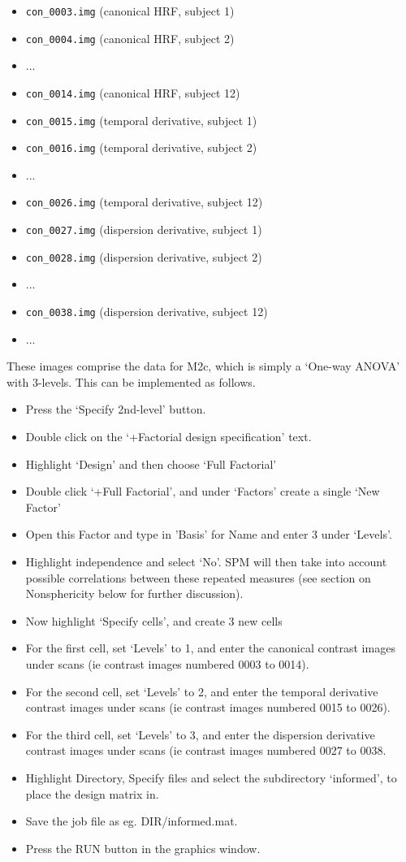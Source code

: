 \documentclass[a4paper,titlepage]{book}
\newcommand{\bi}{\begin{itemize}}
\newcommand{\ei}{\end{itemize}}
\begin{document}
\bi
\item{\verb!con_0003.img!		(canonical HRF, subject 1)}
\item{\verb!con_0004.img!		(canonical HRF, subject 2)}
\item{...}
\item{\verb!con_0014.img!		(canonical HRF, subject 12)}
\item{\verb!con_0015.img!		(temporal derivative, subject 1)}
\item{\verb!con_0016.img!		(temporal derivative, subject 2)}
\item{...}
\item{\verb!con_0026.img!		(temporal derivative, subject 12)}
\item{\verb!con_0027.img!		(dispersion derivative, subject 1)}
\item{\verb!con_0028.img!		(dispersion derivative, subject 2)}
\item{...}
\item{\verb!con_0038.img!		(dispersion derivative, subject 12)}
\item{...}
\ei
These images comprise the data for M2c, which is simply a `One-way ANOVA' with 3-levels. This can be implemented as follows.
\bi
\item{Press the `Specify 2nd-level' button.}
\item{Double click on the `+Factorial design specification' text.}
\item{Highlight `Design' and then choose `Full Factorial'}
\item{Double click `+Full Factorial', and under `Factors' create a single `New Factor'}
\item{Open this Factor and type in 'Basis' for Name and enter 3 under `Levels'.}
\item{Highlight independence and select `No'. SPM will then take into account possible correlations between these repeated measures (see section on Nonsphericity below for further discussion).}
\item{Now highlight `Specify cells', and create 3 new cells}  
\item{For the first cell, set `Levels' to 1, and enter the canonical contrast images under scans (ie contrast images numbered 0003 to 0014).}    
\item{For the second cell, set `Levels' to 2, and enter the 
temporal derivative contrast images under scans (ie contrast images numbered 0015 to 0026).}   
\item{For the third cell, set `Levels' to 3, and enter the 
dispersion derivative contrast images under scans (ie contrast images numbered 0027 to 0038.}
\item{Highlight Directory, Specify files and select the 
subdirectory `informed', to place the design matrix in.}
\item{Save the job file as eg. {\sf DIR/informed.mat}}.
\item{Press the RUN button in the graphics window.}
\ei
\end{document}
